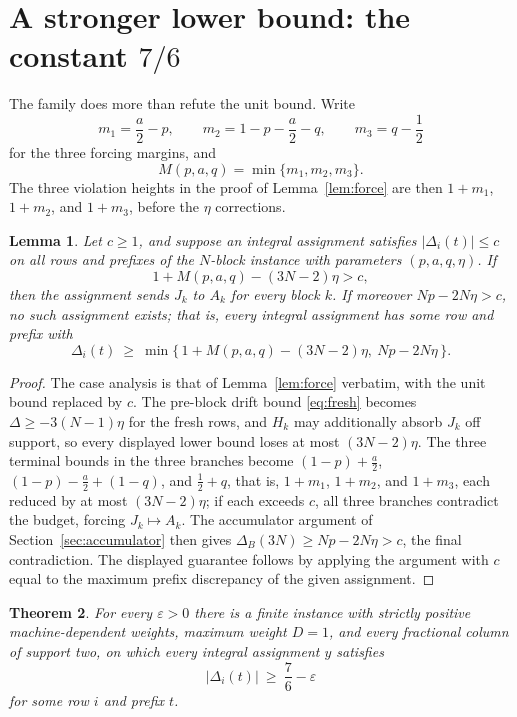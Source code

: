 \documentclass[11pt]{article}
\newtheorem{theorem}{Theorem}
\newtheorem{lemma}[theorem]{Lemma}
\theoremstyle{definition}
\newcommand{\disc}{\Delta}
\newcommand{\eps}{\varepsilon}
\begin{document}
\section{A stronger lower bound: the constant $7/6$}\label{sec:stronger}

The family does more than refute the unit bound.  Write
\[
 m_1=\frac a2-p,
 \qquad
 m_2=1-p-\frac a2-q,
 \qquad
 m_3=q-\frac12
\]
for the three forcing margins, and
\[
 M(p,a,q)=\min\{m_1,m_2,m_3\}.
\]
The three violation heights in the proof of Lemma~\ref{lem:force} are then
$1+m_1$, $1+m_2$, and $1+m_3$, before the $\eta$ corrections.

\begin{lemma}\label{lem:budget}
Let $c\ge1$, and suppose an integral assignment satisfies
$|\disc_i(t)|\le c$ on all rows and prefixes of the $N$-block instance with
parameters $(p,a,q,\eta)$.  If
\[
 1+M(p,a,q)-(3N-2)\eta>c,
\]
then the assignment sends $J_k$ to $A_k$ for every block $k$.  If moreover
$Np-2N\eta>c$, no such assignment exists; that is, every integral assignment
has some row and prefix with
\[
 \disc_i(t)\ \ge\ \min\bigl\{\,1+M(p,a,q)-(3N-2)\eta,\ Np-2N\eta\,\bigr\}.
\]
\end{lemma}

\begin{proof}
The case analysis is that of Lemma~\ref{lem:force} verbatim, with the unit
bound replaced by $c$.  The pre-block drift bound \eqref{eq:fresh} becomes
$\disc\ge-3(N-1)\eta$ for the fresh rows, and $H_k$ may additionally absorb
$J_k$ off support, so every displayed lower bound loses at most
$(3N-2)\eta$.  The three terminal bounds in the three branches become
$(1-p)+\frac a2$, $(1-p)-\frac a2+(1-q)$, and $\frac12+q$, that is,
$1+m_1$, $1+m_2$, and $1+m_3$, each reduced by at most $(3N-2)\eta$; if each
exceeds $c$, all three branches contradict the budget, forcing
$J_k\mapsto A_k$.  The accumulator argument of
Section~\ref{sec:accumulator} then gives $\disc_B(3N)\ge Np-2N\eta>c$, the
final contradiction.
The displayed guarantee follows by applying the argument with $c$ equal to
the maximum prefix discrepancy of the given assignment.
\end{proof}

\begin{theorem}\label{thm:seven-sixths}
For every $\eps>0$ there is a finite instance with strictly positive
machine-dependent weights, maximum weight $D=1$, and every fractional column
of support two, on which every integral assignment $y$ satisfies
\[
 |\disc_i(t)|\ \ge\ \frac76-\eps
\]
for some row $i$ and prefix $t$.
\end{theorem}
\end{document}
